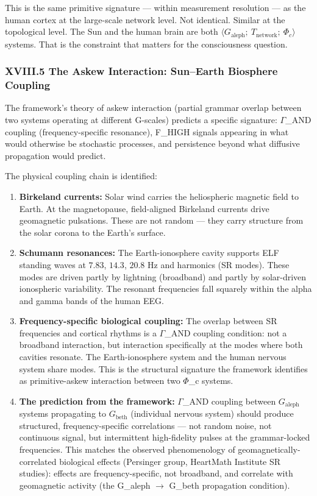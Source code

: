 \documentclass[12pt,a4paper]{article}
\begin{document}
This is the same primitive signature --- within measurement resolution --- as the human cortex at the large-scale network level. Not identical. Similar at the topological level. The Sun and the human brain are both $\langle G_\text{aleph};\ T_\text{network};\ \Phi_c \rangle$ systems. That is the constraint that matters for the consciousness question.

\subsubsection{XVIII.5 The Askew Interaction: Sun--Earth Biosphere Coupling}

The framework's theory of askew interaction (partial grammar overlap between two systems operating at different G-scales) predicts a specific signature: $\Gamma$\_AND coupling (frequency-specific resonance), F\_HIGH signals appearing in what would otherwise be stochastic processes, and persistence beyond what diffusive propagation would predict.

The physical coupling chain is identified:

\begin{enumerate}
    \item \textbf{Birkeland currents:} Solar wind carries the heliospheric magnetic field to Earth. At the magnetopause, field-aligned Birkeland currents drive geomagnetic pulsations. These are not random --- they carry structure from the solar corona to the Earth's surface.
    \item \textbf{Schumann resonances:} The Earth-ionosphere cavity supports ELF standing waves at $7.83$, $14.3$, $20.8$ Hz and harmonics (SR modes). These modes are driven partly by lightning (broadband) and partly by solar-driven ionospheric variability. The resonant frequencies fall squarely within the alpha and gamma bands of the human EEG.
    \item \textbf{Frequency-specific biological coupling:} The overlap between SR frequencies and cortical rhythms is a $\Gamma$\_AND coupling condition: not a broadband interaction, but interaction specifically at the modes where both cavities resonate. The Earth-ionosphere system and the human nervous system share modes. This is the structural signature the framework identifies as primitive-askew interaction between two $\Phi$\_c systems.
    \item \textbf{The prediction from the framework:} $\Gamma$\_AND coupling between $G_\text{aleph}$ systems propagating to $G_\text{beth}$ (individual nervous system) should produce structured, frequency-specific correlations --- not random noise, not continuous signal, but intermittent high-fidelity pulses at the grammar-locked frequencies. This matches the observed phenomenology of geomagnetically-correlated biological effects (Persinger group, HeartMath Institute SR studies): effects are frequency-specific, not broadband, and correlate with geomagnetic activity (the G\_aleph $\rightarrow$ G\_beth propagation condition).
\end{enumerate}
\end{document}
